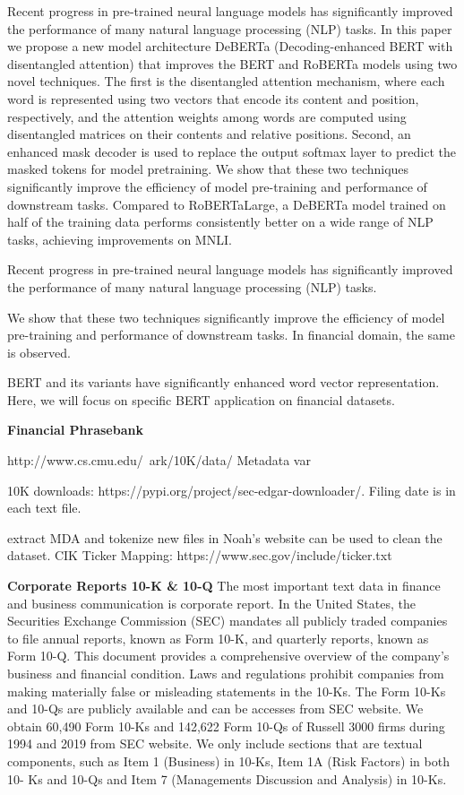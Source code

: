 \documentclass[11pt]{article}
\begin{document}
Recent progress in pre-trained neural language models has significantly improved the performance of many natural language processing (NLP) tasks. In this paper we
propose a new model architecture DeBERTa (Decoding-enhanced BERT with disentangled attention) that improves the BERT and RoBERTa models using two novel
techniques. The first is the disentangled attention mechanism, where each word is represented using two vectors that encode its content and position, respectively,
and the attention weights among words are computed using disentangled
matrices on their contents and relative positions. Second, an enhanced mask decoder is used
to replace the output softmax layer to predict the masked tokens for model pretraining. We show that these two techniques significantly improve the efficiency of
model pre-training and performance of downstream tasks. Compared to RoBERTaLarge, a DeBERTa model trained on half of the training data performs consistently
better on a wide range of NLP tasks, achieving improvements on MNLI.

Recent progress in pre-trained neural language models has significantly improved the performance of many natural language processing (NLP) tasks.

We show that these two techniques significantly improve the efficiency of
model pre-training and performance of downstream tasks. In financial
domain, the same is observed.

BERT and its variants have significantly enhanced word vector representation. Here, we will focus on specific BERT application on financial
datasets.


\textbf{Financial Phrasebank}


http://www.cs.cmu.edu/~ark/10K/data/
Metadata var

10K downloads: https://pypi.org/project/sec-edgar-downloader/. Filing
date is in each text file.

extract MDA and tokenize new files in Noah's website can be used to clean the dataset.
CIK Ticker Mapping: https://www.sec.gov/include/ticker.txt





\textbf{Corporate Reports 10-K \& 10-Q} The most important text data in finance and business communication is corporate report. In the United States,
the Securities Exchange Commission (SEC) mandates all publicly traded companies to file annual
reports, known as Form 10-K, and quarterly reports, known as Form 10-Q. This document provides a comprehensive overview of the company’s
business and financial condition. Laws and regulations prohibit companies from making materially
false or misleading statements in the 10-Ks. The
Form 10-Ks and 10-Qs are publicly available and can be accesses from
SEC website. We obtain 60,490 Form 10-Ks and 142,622
Form 10-Qs of Russell 3000 firms during 1994 and
2019 from SEC website. We only include sections that are textual components, such as Item 1 (Business) in 10-Ks, Item 1A (Risk Factors) in both 10-
Ks and 10-Qs and Item 7 (Managements Discussion and Analysis) in 10-Ks.




\end{document}
